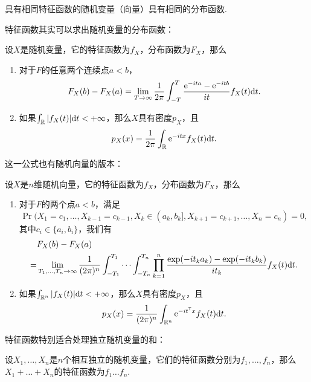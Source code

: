 \begin{theorem}\label{prop:characteristic-function-uniqueness}
具有相同特征函数的随机变量（向量）具有相同的分布函数.
\end{theorem}

特征函数其实可以求出随机变量的分布函数：
\begin{theorem}[逆转公式]\label{prop:characteristic-function}
设$X$是随机变量，它的特征函数为$f_X$，分布函数为$F_X$，那么
\begin{enumerate}
    \item 对于$F$的任意两个连续点$a<b$，
    \[F_X(b)-F_X(a)=\lim_{T\to\infty}\frac{1}{2\pi}\int_{-T}^T\frac{\mathrm{e}^{-ita}-\mathrm{e}^{-itb}}{it}f_X(t)\mathrm{d} t.\]
    \item 如果$\int_{\mathbb{R}}|f_X(t)|\mathrm{d} t<+\infty$，那么$X$具有密度$p_X$，且
    \[p_X(x)=\frac{1}{2\pi}\int_{\mathbb{R}}\mathrm{e}^{-itx}f_X(t)\mathrm{d} t.\]
\end{enumerate}
\end{theorem}

这一公式也有随机向量的版本：

\begin{theorem}\label{prop:characteristic-function-vector}
设$X$是$n$维随机向量，它的特征函数为$f_X$，分布函数为$F_X$，那么
\begin{enumerate}
    \item 对于$F$的两个点$a<b$，满足
    \[\Pr(X_1=c_1,\dots,X_{k-1}=c_{k-1},X_k\in(a_k,b_k],X_{k+1}=c_{k+1},\dots,X_n=c_n)=0,\]
    其中$c_i\in\{a_i,b_i\}$，我们有
    \begin{align*}
        &F_X(b)-F_X(a)\\
        =&\lim_{T_1,\dots,T_n\to\infty}\frac{1}{(2\pi)^n}\int_{-T_1}^{T_1}\cdots\int_{-T_n}^{T_n}\prod_{k=1}^n\frac{\exp(-it_ka_k)-\exp(-it_kb_k)}{it_k}f_X(t)\mathrm{d} t.
    \end{align*}
    \item 如果$\int_{\mathbb{R}^n}|f_X(t)|\mathrm{d} t<+\infty$，那么$X$具有密度$p_X$，且
    \[p_X(x)=\frac{1}{(2\pi)^n}\int_{\mathbb{R}^n}\mathrm{e}^{-it^{\mathsf{T}} x}f_X(t)\mathrm{d} t.\]
\end{enumerate}
\end{theorem}

特征函数特别适合处理独立随机变量的和：

\begin{proposition}\label{prop:characteristic-function-sum}
设$X_1,\dots,X_n$是$n$个相互独立的随机变量，它们的特征函数分别为$f_1,\dots,f_n$，那么$X_1+\dots+X_n$的特征函数为$f_1\dots f_n$.
\end{proposition}

